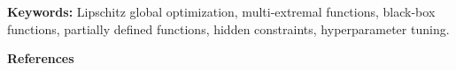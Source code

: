 \documentclass[a4paper,12pt,russian]{article}
\begin{document}
\begin{small}

\textbf{Keywords:} Lipschitz global optimization, multi-extremal functions, black-box functions, partially defined functions, hidden constraints, hyperparameter tuning.
\newline
\end{small}
\newline
{\large \textbf{References}}
\end{document}
